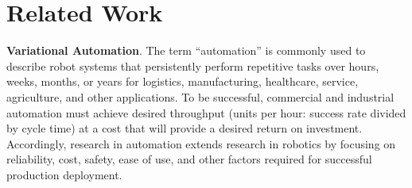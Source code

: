 % 







\section{Related Work}

\textbf{Variational Automation}.
The term ``automation'' is commonly used to describe robot systems that persistently perform repetitive tasks over hours, weeks, months, or years for logistics, manufacturing, healthcare, service, agriculture, and other applications. To be successful, commercial and industrial automation must achieve desired throughput (units per hour: success rate divided by cycle time) at a cost that will provide a desired return on investment. Accordingly, research in automation extends research in robotics by focusing on reliability, cost, safety, ease of use, and other factors required for successful production deployment.

